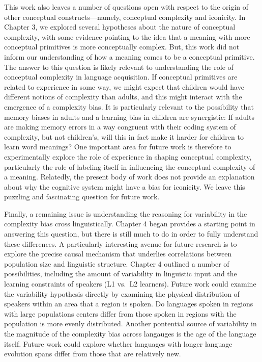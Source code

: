 This work also leaves a number of questions open with respect to the origin of other conceptual constructs---namely, conceptual complexity and iconicity. In Chapter 3, we explored several hypotheses about the nature of conceptual complexity, with some evidence pointing to the idea that a meaning with more conceptual primitives is more conceptually complex. But, this work did not inform our understanding of how a meaning comes to be a conceptual primitive. The answer to this question is likely relevant to understanding the role of conceptual complexity in language acquisition. If conceptual primitives are related to experience in some way, we might expect that children would have different notions of complexity than adults, and this might interact with the emergence of a complexity bias. It is particularly relevant to the possibility that memory biases in adults and a learning bias in children are synergistic: If adults are making memory errors in a way congruent with their coding system of complexity, but not children's, will this in fact make it harder for children to learn word meanings? One important area for future work is therefore  to experimentally explore the role of experience in shaping conceptual complexity, particularly the role of labeling itself in influencing the conceptual complexity of a meaning.  Relatedly, the present body of  work does not provide an explanation about why the cognitive system might have a bias for iconicity. We leave this puzzling and fascinating question for future work.


Finally, a remaining issue is understanding the reasoning for variability in the complexity bias cross linguistically. Chapter 4 began provides a starting point in answering this question, but there is still much to do in order to fully understand these differences. A particularly interesting avenue for future research is to explore the precise causal mechanism that underlies correlations between population size and linguistic structure. Chapter 4 outlined a number of possibilities, including the amount of variability in linguistic input and the learning constraints of speakers (L1 vs.\ L2 learners). Future work could examine the variability hypothesis directly by examining the physical distribution of speakers within an area that a region is spoken. Do languages spoken in regions with  large populations centers differ from those spoken in regions with the population is more evenly distributed. Another pontential source of variability in the magnitude of the complexity bias across langauges is the age of the language itself. Future work could explore whether languages with longer language evolution spans differ from those that are relatively new. 

